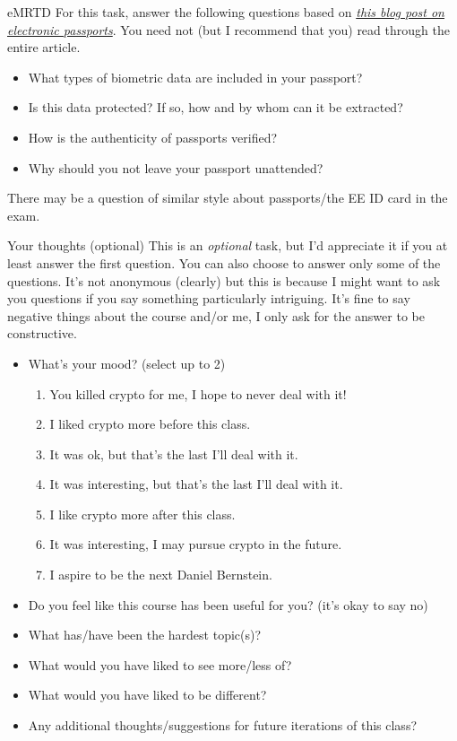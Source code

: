 \documentclass{homework}
\begin{document}
\begin{task}{eMRTD}
  For this task, answer the following questions based on \textit{\href{https://blog.trailofbits.com/2025/10/31/the-cryptography-behind-electronic-passports/}{this blog post on electronic passports}}.
  You need not (but I recommend that you) read through the entire article.
  \begin{itemize}
    \item What types of biometric data are included in your passport?
    \item Is this data protected?
    If so, how and by whom can it be extracted?
    \item How is the authenticity of passports verified?
    \item Why should you not leave your passport unattended?
  \end{itemize}

  There may be a question of similar style about passports/the EE ID card in the exam.
\end{task}

\begin{task}{Your thoughts (optional)}
  This is an \emph{optional} task, but I'd appreciate it if you at least answer the first question.
  You can also choose to answer only some of the questions.
  It's not anonymous (clearly) but this is because I might want to ask you questions if you say something particularly intriguing.
  It's fine to say negative things about the course and/or me, I only ask for the answer to be constructive.

  \begin{itemize}
    \item What's your mood? (select up to 2)
    \begin{enumerate}
      \item You killed crypto for me, I hope to never deal with it!
      \item I liked crypto more before this class.
      \item It was ok, but that's the last I'll deal with it.
      \item It was interesting, but that's the last I'll deal with it.
      \item I like crypto more after this class.
      \item It was interesting, I may pursue crypto in the future.
      \item I aspire to be the next Daniel Bernstein.
    \end{enumerate}
    \item Do you feel like this course has been useful for you? (it's okay to say no)
    \item What has/have been the hardest topic(s)?
    \item What would you have liked to see more/less of?
    \item What would you have liked to be different?
    \item Any additional thoughts/suggestions for future iterations of this class?
  \end{itemize}
\end{task}
\end{document}
